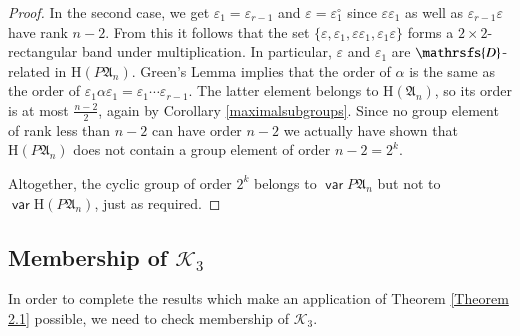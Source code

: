 \documentclass[preprint,1p,times]{elsarticle}
\DeclareMathOperator{\var}{\mathsf{var}}
\numberwithin{equation}{section}
\theoremstyle{remark}
\def\Dc{\mathrsfs{D}}
\def\ep{\varepsilon}
\def\H{\mathrm H}
\def\A{\mathfrak{A}}
\begin{document}
\begin{proof}
In the second case, we get $\ep_1=\ep_{r-1}$ and $\ep=\ep_1^\circ$ since $\ep\ep_1$ as well as $\ep_{r-1}\ep$ have
rank $n-2$. From this it follows that the set $\{\ep,\ep_1,\ep\ep_1,\ep_1\ep\}$ forms a $2\times 2$-rectangular band
under multiplication. In particular, $\ep$ and $\ep_1$ are $\Dc$-related in $\H (P\A_n)$. Green's Lemma implies that
the order of $\alpha$ is the same as the order of $\ep_1\alpha\ep_1=\ep_1\cdots\ep_{r-1}$. The latter element belongs
to $\H(\A_n)$, so its order is at most $\frac{n-2}2$, again by Corollary \ref{maximalsubgroups}. Since no group element
of rank less than $n-2$ can have order $n-2$ we actually have shown that $\H (P\A_n)$ does not contain a group element
of order $n-2=2^k$.

Altogether, the cyclic group of order $2^k$ belongs to $\var P\A_n$ but not to $\var\H (P\A_n)$, just as required.
\end{proof}

\subsection{Membership of $\mathcal{K}_3$}
In order to complete the results which make an application of Theorem \ref{Theorem 2.1} possible, we need to check
membership of $\mathcal{K}_3$.
\end{document}
